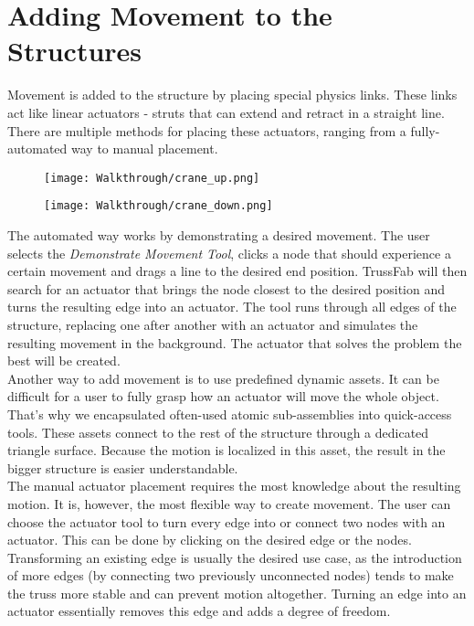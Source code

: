 \section{Adding Movement to the Structures}
Movement is added to the structure by placing special physics links. These links act like linear actuators - struts that can extend and retract in a straight line. There are multiple methods for placing these actuators, ranging from a fully-automated way to manual placement.
\begin{figure}
  \centering
  \begin{minipage}{.5\textwidth}
    \centering
    \texttt{[image: Walkthrough/crane\_up.png]}
    \label{fig:leg_asset}
  \end{minipage}%
  \begin{minipage}{.5\textwidth}
    \centering
    \texttt{[image: Walkthrough/crane\_down.png]}
    \label{fig:spider_in_progress}
  \end{minipage}
\end{figure}
The automated way works by demonstrating a desired movement. The user selects the \textit{Demonstrate Movement Tool}, clicks a node that should experience a certain movement and drags a line to the desired end position. TrussFab will then search for an actuator that brings the node closest to the desired position and turns the resulting edge into an actuator. The tool runs through all edges of the structure, replacing one after another with an actuator and simulates the resulting movement in the background. The actuator that solves the problem the best will be created.\\
Another way to add movement is to use predefined dynamic assets. It can be difficult for a user to fully grasp how an actuator will move the whole object. That's why we encapsulated often-used atomic sub-assemblies into quick-access tools. These assets connect to the rest of the structure through a dedicated triangle surface. Because the motion is localized in this asset, the result in the bigger structure is easier understandable.\\
The manual actuator placement requires the most knowledge about the resulting motion. It is, however, the most flexible way to create movement. The user can choose the actuator tool to turn every edge into or connect two nodes with an actuator. This can be done by clicking on the desired edge or the nodes. Transforming an existing edge is usually the desired use case, as the introduction of more edges (by connecting two previously unconnected nodes) tends to make the truss more stable and can prevent motion altogether. Turning an edge into an actuator essentially removes this edge and adds a degree of freedom.
